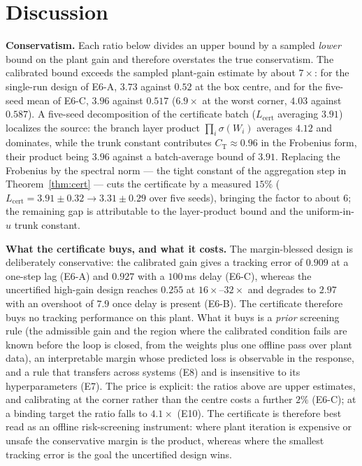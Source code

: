 \documentclass[11pt,sagev,times]{sagej}
\newcommand{\Lhat}{L_{\mathrm{cert}}}
\begin{document}
\section{Discussion}\label{sec:discussion}

\textbf{Conservatism.} Each ratio below divides an upper bound by a sampled \emph{lower} bound on the
plant gain and therefore overstates the true conservatism. The calibrated bound exceeds
the sampled plant-gain estimate by about $7\times$: for the single-run design
of E6-A, $3.73$ against $0.52$ at the box centre, and for the five-seed mean
of E6-C, $3.96$ against $0.517$ ($6.9\times$ at the worst corner, $4.03$
against $0.587$). A five-seed decomposition of the certificate batch
($\Lhat$ averaging $3.91$) localizes the source: the
branch layer product $\prod_i\sigma(W_i)$ averages $4.12$ and dominates,
while the trunk constant contributes $C_{\mathrm{T}}\approx0.96$ in the
Frobenius form, their product being $3.96$ against a batch-average bound of
$3.91$. Replacing the
Frobenius by the spectral norm --- the tight constant of the
aggregation step in Theorem~\ref{thm:cert} --- cuts the certificate by a
measured $15\%$ ($\Lhat=3.91\pm0.32\to3.31\pm0.29$ over five seeds),
bringing the factor to about $6$; the remaining gap is attributable to the
layer-product bound and the uniform-in-$u$ trunk constant.

\textbf{What the certificate buys, and what it costs.} The margin-blessed
design is deliberately conservative: the calibrated gain gives a tracking
error of $0.909$ at a one-step lag (E6-A) and $0.927$ with a $100$\,ms delay
(E6-C), whereas the uncertified high-gain design reaches $0.255$ at
$16\times$--$32\times$ and degrades to $2.97$ with an overshoot of $7.9$ once
delay is present (E6-B). The certificate therefore buys no tracking
performance on this plant. What it buys is a \emph{prior} screening rule (the
admissible gain and the region where the calibrated condition fails are known
before the loop is closed, from the weights plus one offline pass over plant
data), an interpretable margin whose predicted loss is observable in the
response, and a rule that transfers across systems (E8) and is insensitive to
its hyperparameters (E7).
The price is explicit: the ratios above are upper estimates, and
calibrating at the corner rather than the centre costs a further $2\%$
(E6-C); at a binding target the ratio falls to $4.1\times$ (E10). The certificate is therefore best read
as an offline risk-screening instrument: where plant iteration is expensive or
unsafe the conservative margin is the product, whereas where the smallest
tracking error is the goal the uncertified design wins.
\end{document}
